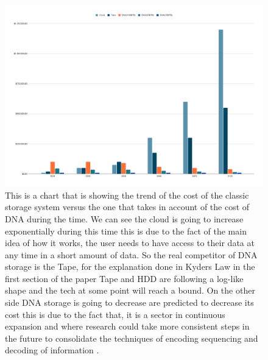 \documentclass[10pt,twocolumn,twoside]{gsajnl}
\theoremstyle{definition}
\begin{document}
\begin{figure}[ht]
\centering
\includegraphics[width=\linewidth]{Figures/economicschart.png}
\caption{This is a chart that is showing the trend of the cost of the classic storage system versus the one that takes in
account of the cost of DNA during the time.
We can see the cloud is going to increase exponentially during this time this is due to the fact of the main idea of how
it works, the user needs to have access to their data at any time in a short amount of data. So the real competitor of
DNA storage is the Tape, for the explanation done in Kyders Law in the first section of the paper Tape and HDD are
following a log-like shape and the tech at some point will reach a bound. On the other side DNA storage is going
to decrease are predicted to decrease its cost this is due to the fact that, it is a sector in continuous expansion and
where research could take more consistent steps in the future to consolidate the techniques of encoding sequencing
and decoding of information \cite{alliance2021preserving}.}
\label{fig11}
\end{figure}
\end{document}
